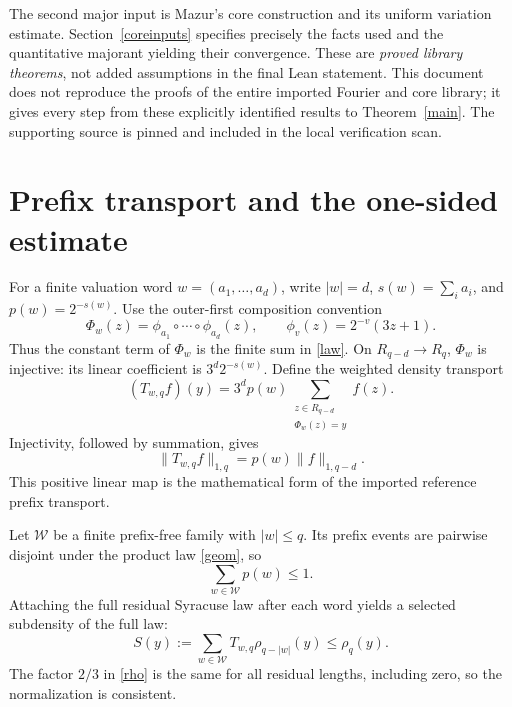 \documentclass[11pt,a4paper]{article}
\theoremstyle{definition}\newtheorem{definition}[theorem]{Definition}
\theoremstyle{remark}\newtheorem{remark}[theorem]{Remark}
\newcommand{\normone}[2]{\lVert #2\rVert_{1,#1}}
\begin{document}
The second major input is Mazur's core construction and its uniform
variation estimate. Section~\ref{coreinputs} specifies precisely the facts
used and the quantitative majorant yielding their convergence. These are
\emph{proved library theorems}, not added assumptions in the final Lean
statement. This document does not reproduce the proofs of the entire
imported Fourier and core library; it gives every step from these explicitly
identified results to Theorem~\ref{main}. The supporting source is pinned
and included in the local verification scan.

\section{Prefix transport and the one-sided estimate}
For a finite valuation word $w=(a_1,\ldots,a_d)$, write
$|w|=d$, $s(w)=\sum_i a_i$, and $p(w)=2^{-s(w)}$. Use the outer-first
composition convention
\[
 \Phi_w(z)=\phi_{a_1}\circ\cdots\circ\phi_{a_d}(z),
 \qquad \phi_v(z)=2^{-v}(3z+1).
\]
Thus the constant term of $\Phi_w$ is the finite sum in \eqref{law}.
On $R_{q-d}\to R_q$, $\Phi_w$ is injective: its linear coefficient is
$3^d2^{-s(w)}$. Define the weighted density transport
\begin{equation}\label{transport}
 (T_{w,q}f)(y)=3^d p(w)\sum_{\substack{z\in R_{q-d}\\\Phi_w(z)=y}}f(z).
\end{equation}
Injectivity, followed by summation, gives
\begin{equation}\label{transportnorm}
 \normone q{T_{w,q}f}=p(w)\normone{q-d}f.
\end{equation}
This positive linear map is the mathematical form of the imported
reference prefix transport.

Let $\mathcal W$ be a finite prefix-free family with $|w|\le q$.
Its prefix events are pairwise disjoint under the product law
\eqref{geom}, so
\begin{equation}\label{kraft}
 \sum_{w\in\mathcal W}p(w)\le1.
\end{equation}
Attaching the full residual Syracuse law after each word yields a selected
subdensity of the full law:
\begin{equation}\label{selected}
 S(y):=\sum_{w\in\mathcal W}T_{w,q}\rho_{q-|w|}(y)\le\rho_q(y).
\end{equation}
The factor $2/3$ in \eqref{rho} is the same for all residual lengths,
including zero, so the normalization is consistent.
\end{document}
